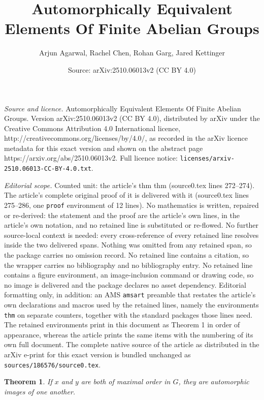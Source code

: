 \documentclass[10pt,a4paper]{amsart}
\title{Automorphically Equivalent Elements Of Finite Abelian Groups}
\author{Arjun Agarwal, Rachel Chen, Rohan Garg, Jared Kettinger}
\date{Source: arXiv:2510.06013v2 (CC BY 4.0)}
\newtheorem{thm}{Theorem}
\begin{document}
\maketitle

\noindent\emph{Source and licence.} Automorphically Equivalent Elements Of Finite Abelian Groups. Version arXiv:2510.06013v2 (CC BY 4.0), distributed by arXiv under the Creative Commons Attribution 4.0 International licence, http://creativecommons.org/licenses/by/4.0/, as recorded in the arXiv licence metadata for this exact version and shown on the abstract page https://arxiv.org/abs/2510.06013v2. Full licence notice: \texttt{licenses/arxiv-2510.06013-CC-BY-4.0.txt}.\par\smallskip

\noindent\textit{Editorial scope.} Counted unit: the article's thm thm (source0.tex lines 272--274). The article's complete original proof of it is delivered with it (source0.tex lines 275--286, one \texttt{proof} environment of 12 lines). No mathematics is written, repaired or re-derived: the statement and the proof are the article's own lines, in the article's own notation, and no retained line is substituted or re-flowed.  No further source-local context is needed: every cross-reference of every retained line resolves inside the two delivered spans.  Nothing was omitted from any retained span, so the package carries no omission record.  No retained line contains a citation, so the wrapper carries no bibliography and no bibliography entry.  No retained line contains a figure environment, an image-inclusion command or drawing code, so no image is delivered and the package declares no asset dependency.  Editorial formatting only, in addition: an AMS \texttt{amsart} preamble that restates the article's own declarations and macros used by the retained lines, namely the environments \texttt{thm} on separate counters, together with the standard packages those lines need.  The retained environments print in this document as Theorem 1 in order of appearance, whereas the article prints the same items with the numbering of its own full document.  The complete native source of the article as distributed in the arXiv e-print for this exact version is bundled unchanged as \texttt{sources/186576/source0.tex}.
\begin{thm}
If $x$ and $y$ are both of maximal order in $G$, they are automorphic images of one another. 
\end{thm}
\end{document}
